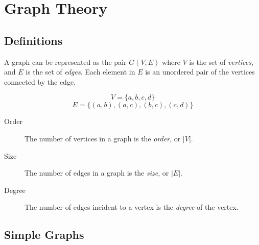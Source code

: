 \chapter{Graph Theory}

\section{Definitions}

A graph can be represented as the pair $G(V, E)$ where $V$
is the set of \textit{vertices}, and $E$ is the set of
\textit{edges}. Each element in $E$ is an unordered pair of
the vertices connected by the edge.

$$V = \{a, b, c, d\}$$
$$E = \{(a, b), (a, c), (b, c), (c, d)\}$$

\begin{center}
\end{center}

\begin{description}
    \item[Order] The number of vertices in a graph is the
    \textit{order}, or $|V|$.

    \item[Size] The number of edges in a graph is the
    \textit{size}, or $|E|$.

    \item[Degree] The number of edges incident to a vertex
    is the \textit{degree} of the vertex.

\end{description}

\section{Simple Graphs}

